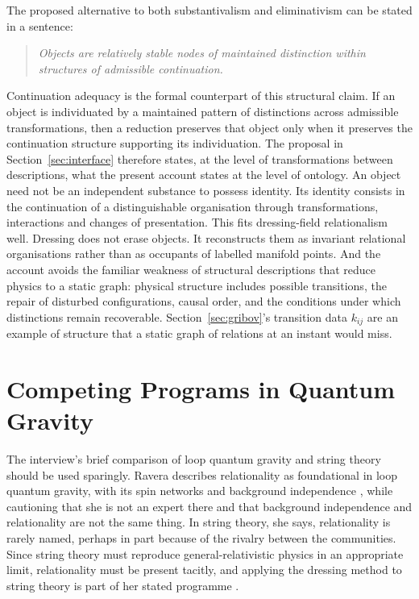 \documentclass[11pt]{article}
\theoremstyle{plain}
\theoremstyle{definition}
\theoremstyle{remark}
\begin{document}
The proposed alternative to both substantivalism and eliminativism can be stated in a sentence:
\begin{quote}
\emph{Objects are relatively stable nodes of maintained distinction within structures of admissible continuation.}
\end{quote}
Continuation adequacy is the formal counterpart of this structural claim. If an object is individuated by a maintained pattern of distinctions across admissible transformations, then a reduction preserves that object only when it preserves the continuation structure supporting its individuation. The proposal in Section~\ref{sec:interface} therefore states, at the level of transformations between descriptions, what the present account states at the level of ontology.
An object need not be an independent substance to possess identity. Its identity consists in the continuation of a distinguishable organisation through transformations, interactions and changes of presentation. This fits dressing-field relationalism well. Dressing does not erase objects. It reconstructs them as invariant relational organisations rather than as occupants of labelled manifold points. And the account avoids the familiar weakness of structural descriptions that reduce physics to a static graph: physical structure includes possible transitions, the repair of disturbed configurations, causal order, and the conditions under which distinctions remain recoverable. Section~\ref{sec:gribov}'s transition data $k_{ij}$ are an example of structure that a static graph of relations at an instant would miss.

\section{Competing Programs in Quantum Gravity}\label{sec:qg}

The interview's brief comparison of loop quantum gravity and string theory should be used sparingly. Ravera describes relationality as foundational in loop quantum gravity, with its spin networks and background independence \cite{rovelli-smolin}, while cautioning that she is not an expert there and that background independence and relationality are not the same thing. In string theory, she says, relationality is rarely named, perhaps in part because of the rivalry between the communities. Since string theory must reproduce general-relativistic physics in an appropriate limit, relationality must be present tacitly, and applying the dressing method to string theory is part of her stated programme \cite{toe}.
\end{document}
